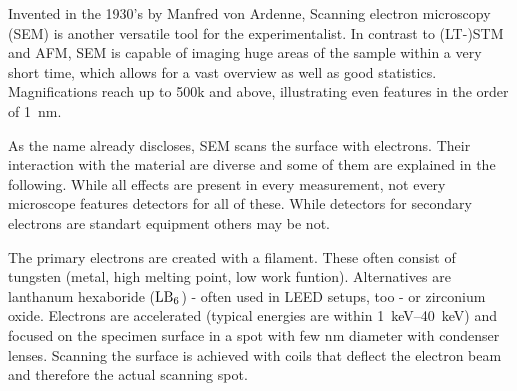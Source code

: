 Invented in the 1930's by Manfred von Ardenne\cite{ardenne_elektronen-rastermikroskop_1938}, Scanning electron microscopy (SEM) is another versatile tool for the experimentalist. In contrast to (LT-)STM and AFM, SEM is capable of imaging huge areas of the sample within a very short time, which allows for a vast overview as well as good statistics. Magnifications reach up to 500k and above, illustrating even features in the order of \SI{1}{\nano \meter}.

As the name already discloses, SEM scans the surface with electrons. Their interaction with the material are diverse and some of them are explained in the following. While all effects are present in every measurement, not every microscope features detectors for all of these. While detectors for secondary electrons are standart equipment others may be not.


The primary electrons are created with a filament. These often consist of tungsten (metal, high melting point, low work funtion). Alternatives are lanthanum hexaboride ($\textnormal{LB}_6$) - often used in LEED setups, too - or zirconium oxide.
Electrons are accelerated (typical energies are within \SIrange{1}{40}{\kilo \eV}) and focused on the specimen surface in a spot with few \si{nm} diameter with condenser lenses. Scanning the surface is achieved with coils that deflect the electron beam and therefore the actual scanning spot.

